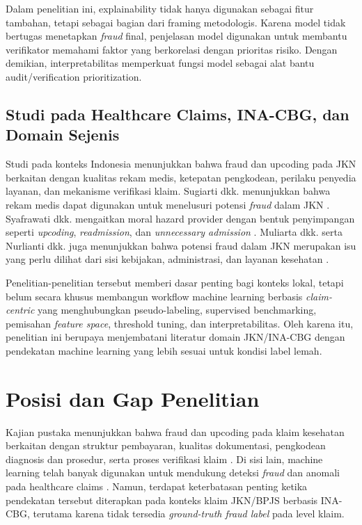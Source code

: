 Dalam penelitian ini, explainability tidak hanya digunakan sebagai fitur tambahan, tetapi sebagai bagian dari framing metodologis. Karena model tidak bertugas menetapkan \emph{fraud} final, penjelasan model digunakan untuk membantu verifikator memahami faktor yang berkorelasi dengan prioritas risiko. Dengan demikian, interpretabilitas memperkuat fungsi model sebagai alat bantu audit/verification prioritization.

\subsection{Studi pada Healthcare Claims, INA-CBG, dan Domain Sejenis}\label{studi-pada-healthcare-claims-ina-cbg-dan-domain-sejenis}

Studi pada konteks Indonesia menunjukkan bahwa fraud dan upcoding pada JKN berkaitan dengan kualitas rekam medis, ketepatan pengkodean, perilaku penyedia layanan, dan mekanisme verifikasi klaim. Sugiarti dkk. menunjukkan bahwa rekam medis dapat digunakan untuk menelusuri potensi \emph{fraud} dalam JKN \citep{sugiarti2021}. Syafrawati dkk. mengaitkan moral hazard provider dengan bentuk penyimpangan seperti \emph{upcoding}, \emph{readmission}, dan \emph{unnecessary admission} \citep{syafrawati2023}. Muliarta dkk. serta Nurlianti dkk. juga menunjukkan bahwa potensi fraud dalam JKN merupakan isu yang perlu dilihat dari sisi kebijakan, administrasi, dan layanan kesehatan \citep{muliarta2023,nurlianti2025}.

Penelitian-penelitian tersebut memberi dasar penting bagi konteks lokal, tetapi belum secara khusus membangun workflow machine learning berbasis \emph{claim-centric} yang menghubungkan pseudo-labeling, supervised benchmarking, pemisahan \emph{feature space}, threshold tuning, dan interpretabilitas. Oleh karena itu, penelitian ini berupaya menjembatani literatur domain JKN/INA-CBG dengan pendekatan machine learning yang lebih sesuai untuk kondisi label lemah.

\section{Posisi dan Gap Penelitian}\label{posisi-dan-gap-penelitian}

Kajian pustaka menunjukkan bahwa fraud dan upcoding pada klaim kesehatan berkaitan dengan struktur pembayaran, kualitas dokumentasi, pengkodean diagnosis dan prosedur, serta proses verifikasi klaim \citep{villegas2021,maryana2024,sugiarti2021}. Di sisi lain, machine learning telah banyak digunakan untuk mendukung deteksi \emph{fraud} dan anomali pada healthcare claims \citep{nabrawi2023,hamid2024,curtis2025}. Namun, terdapat keterbatasan penting ketika pendekatan tersebut diterapkan pada konteks klaim JKN/BPJS berbasis INA-CBG, terutama karena tidak tersedia \emph{ground-truth fraud label} pada level klaim.

